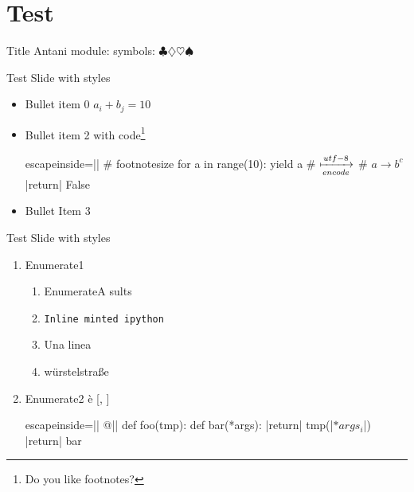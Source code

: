 \section{Test}
\usepackage{pdfcomment}

\begin{pyframe}{Title}
Antani
module: 
symbols: $\clubsuit \diamondsuit \heartsuit \spadesuit$
\end{pyframe}

\begin{pyframe}{Test Slide with styles}
\begin{itemize}
\item Bullet  item 0 $a_i + b_j = 10 $
\item Bullet  item 2 with code\footnote{Do you like footnotes?}
\begin{pycode*}{escapeinside=||}
    # footnotesize
    for  a in range(10):
        yield a
    # $\xmapsto[encode]{utf-8}$
    # $a \rightarrow b^{c}$
    |return| False
\end{pycode*}
\item Bullet Item 3 
\end{itemize}
\end{pyframe}

\begin{pyframe}{Test Slide with styles}
\begin{enumerate}
\item Enumerate1  
    \begin{enumerate}
    \item EnumerateA  sults
    \item \texttt{Inline minted ipython}
    \item Una linea 
    \item w\"urstelstra\ss e
    \end{enumerate}

\item Enumerate2 \`{e} 
 [, ] 
\begin{pycode*}{escapeinside=||}
@||
def foo(tmp):
    def bar(*args):
        |return| tmp(|$*args_{i}$|)
    |return| bar
\end{pycode*}

\end{enumerate}

\end{pyframe}

